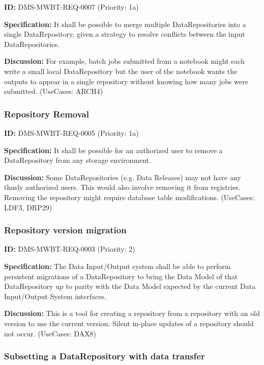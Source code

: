 \documentclass[SE,toc,lsstdraft]{lsstdoc}
\begin{document}
\label{DMS-MWBT-REQ-0007}
\textbf{ID:} DMS-MWBT-REQ-0007 (Priority: 1a)

\textbf{Specification:}
It shall be possible to merge multiple DataRepositories into a single DataRepository, given a strategy to resolve conflicts between the input DataRepositories.

\textbf{Discussion:}
For example, batch jobs submitted from a notebook might each write a small local DataRepository but the user of the notebook wants the outputs to appear in a single repository without knowing how many jobs were submitted. (UseCases: ARCH4)

\subsubsection{Repository Removal}

\label{DMS-MWBT-REQ-0005}
\textbf{ID:} DMS-MWBT-REQ-0005 (Priority: 1a)

\textbf{Specification:}
It shall be possible for an authorized user to remove a DataRepository from any storage environment.

\textbf{Discussion:}
Some DataRepositories (e.g. Data Releases) may not have any thusly authorized users. This would also involve removing it from registries. Removing the repository might require database table modifications. (UseCases: LDF3, DRP29)

\subsubsection{Repository version migration}

\label{DMS-MWBT-REQ-0003}
\textbf{ID:} DMS-MWBT-REQ-0003 (Priority: 2)

\textbf{Specification:}
The Data Input/Output system shall be able to perform persistent migrations of a DataRepository to bring the Data Model of that DataRepository up to parity with the Data Model expected by the current Data Input/Output System interfaces.

\textbf{Discussion:}
This is a tool for creating a repository from a repository with an old version to use the current version. Silent in-place updates of a repository should not occur. (UseCases: DAX8)

\subsubsection{Subsetting a DataRepository with data transfer}
\end{document}
